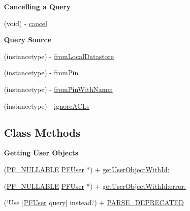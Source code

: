\begin{Indent}{\bf Cancelling a Query}\par
{\em 

 

 }\begin{DoxyCompactItemize}
\item 
(void) -\/ \hyperlink{interface_p_f_query_a27575344e4e9d84bd3fbe1db8cdced39}{cancel}
\end{DoxyCompactItemize}
\end{Indent}
\begin{Indent}{\bf Query Source}\par
{\em 

 

 }\begin{DoxyCompactItemize}
\item 
(instancetype) -\/ \hyperlink{interface_p_f_query_a04816c50721c554db2349cfbe637472f}{from\+Local\+Datastore}
\item 
(instancetype) -\/ \hyperlink{interface_p_f_query_aec25334cc9bf9c212e0e0d6587603787}{from\+Pin}
\item 
(instancetype) -\/ \hyperlink{interface_p_f_query_a4d5fe5dd1a6b90e8bde8b4c8e4eefaf0}{from\+Pin\+With\+Name\+:}
\item 
(instancetype) -\/ \hyperlink{interface_p_f_query_a6afc240c9e11505e4703218b5b53a6a2}{ignore\+A\+C\+Ls}
\end{DoxyCompactItemize}
\end{Indent}
\subsection*{Class Methods}
\begin{Indent}{\bf Getting User Objects}\par
{\em 

 

 }\begin{DoxyCompactItemize}
\item 
(\hyperlink{_p_f_nullability_8h_a528d97a96c5fb279a45c378f5657fca2}{P\+F\+\_\+\+N\+U\+L\+L\+A\+B\+L\+E} \hyperlink{interface_p_f_user}{P\+F\+User} $\ast$) + \hyperlink{interface_p_f_query_acb37ad1e7e0e01a27994cceb156f6302}{get\+User\+Object\+With\+Id\+:}
\item 
(\hyperlink{_p_f_nullability_8h_a528d97a96c5fb279a45c378f5657fca2}{P\+F\+\_\+\+N\+U\+L\+L\+A\+B\+L\+E} \hyperlink{interface_p_f_user}{P\+F\+User} $\ast$) + \hyperlink{interface_p_f_query_a7fcf936af5e0a910422b76a865927567}{get\+User\+Object\+With\+Id\+:error\+:}
\item 
(\char`\"{}Use \mbox{[}\hyperlink{interface_p_f_user}{P\+F\+User} query\mbox{]} instead.\char`\"{}) + \hyperlink{interface_p_f_query_a901b050f600f4d7f7c91d1883240d79b}{P\+A\+R\+S\+E\+\_\+\+D\+E\+P\+R\+E\+C\+A\+T\+E\+D}
\end{DoxyCompactItemize}
\end{Indent}
